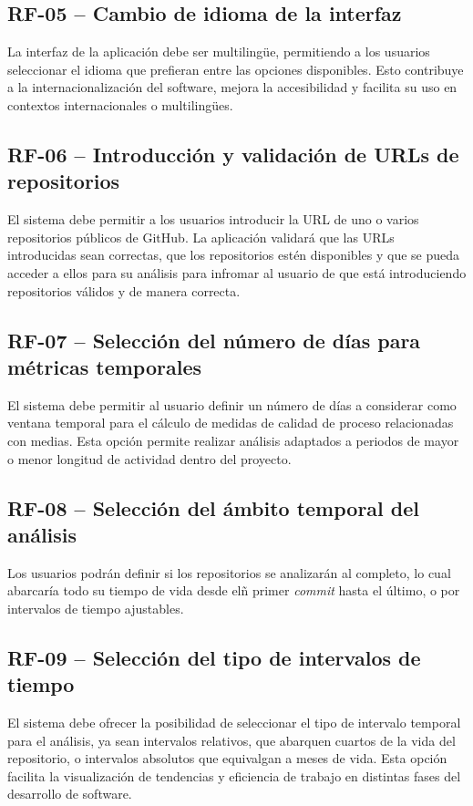 \subsection*{RF-05 – Cambio de idioma de la interfaz}
La interfaz de la aplicación debe ser multilingüe, permitiendo a los usuarios seleccionar el idioma que prefieran entre las opciones disponibles. Esto contribuye a la internacionalización del software, mejora la accesibilidad y facilita su uso en contextos internacionales o multilingües.

\subsection*{RF-06 – Introducción y validación de URLs de repositorios}
El sistema debe permitir a los usuarios introducir la URL de uno o varios repositorios públicos de GitHub. La aplicación validará que las URLs introducidas sean correctas, que los repositorios estén disponibles y que se pueda acceder a ellos para su análisis para infromar al usuario de que está introduciendo repositorios válidos y de manera correcta.

\subsection*{RF-07 – Selección del número de días para métricas temporales}
El sistema debe permitir al usuario definir un número de días a considerar como ventana temporal para el cálculo de medidas de calidad de proceso relacionadas con medias. Esta opción permite realizar análisis adaptados a periodos de mayor o menor longitud de actividad dentro del proyecto.

\subsection*{RF-08 – Selección del ámbito temporal del análisis}
Los usuarios podrán definir si los repositorios se analizarán al completo, lo cual abarcaría todo su tiempo de vida desde elñ primer \textit{commit} hasta el último, o por intervalos de tiempo ajustables.

\subsection*{RF-09 – Selección del tipo de intervalos de tiempo}
El sistema debe ofrecer la posibilidad de seleccionar el tipo de intervalo temporal para el análisis, ya sean intervalos relativos, que abarquen cuartos de la vida del repositorio, o intervalos absolutos que equivalgan a meses de vida. Esta opción facilita la visualización de tendencias y eficiencia de trabajo en distintas fases del desarrollo de software.

